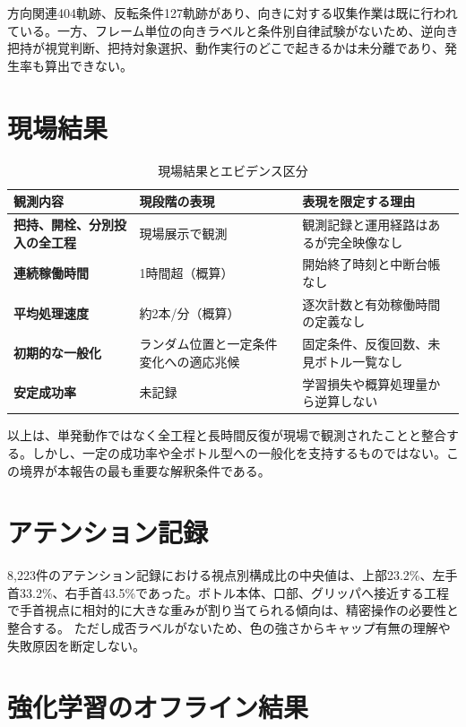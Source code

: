 
方向関連404軌跡、反転条件127軌跡があり、向きに対する収集作業は既に行われている。一方、フレーム単位の向きラベルと条件別自律試験がないため、逆向き把持が視覚判断、把持対象選択、動作実行のどこで起きるかは未分離であり、発生率も算出できない。

\section{現場結果}

\begin{table}[H]
\centering
\caption{現場結果とエビデンス区分}
\begin{tabularx}{\textwidth}{>{\bfseries}p{42mm}p{34mm}X}
\toprule
観測内容 & 現段階の表現 & 表現を限定する理由\\
\midrule
把持、開栓、分別投入の全工程 & 現場展示で観測 & 観測記録と運用経路はあるが完全映像なし\\
連続稼働時間 & 1時間超（概算） & 開始終了時刻と中断台帳なし\\
平均処理速度 & 約2本/分（概算） & 逐次計数と有効稼働時間の定義なし\\
初期的な一般化 & ランダム位置と一定条件変化への適応兆候 & 固定条件、反復回数、未見ボトル一覧なし\\
安定成功率 & 未記録 & 学習損失や概算処理量から逆算しない\\
\bottomrule
\end{tabularx}
\end{table}

以上は、単発動作ではなく全工程と長時間反復が現場で観測されたことと整合する。しかし、一定の成功率や全ボトル型への一般化を支持するものではない。この境界が本報告の最も重要な解釈条件である。

\section{アテンション記録}

8,223件のアテンション記録における視点別構成比の中央値は、上部23.2\%、左手首33.2\%、右手首43.5\%であった。ボトル本体、口部、グリッパへ接近する工程で手首視点に相対的に大きな重みが割り当てられる傾向は、精密操作の必要性と整合する。 ただし成否ラベルがないため、色の強さからキャップ有無の理解や失敗原因を断定しない。

\section{強化学習のオフライン結果}

